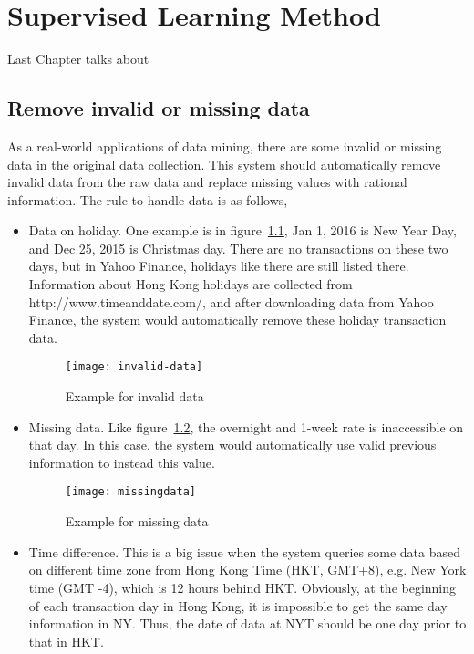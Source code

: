 \chapter{Supervised Learning Method}
\label{ch:machine}

Last Chapter talks about 

\section{Remove invalid or missing data}
As a real-world applications of data mining, there are some invalid or missing data in the original data collection. This system should automatically remove invalid data from the raw data and replace missing values with rational information. The rule to handle data is as follows,

\begin{itemize}
	\item Data on holiday. One example is in figure~\ref{fg:invalid_data}, Jan 1, 2016 is New Year Day, and Dec 25, 2015 is Christmas day. There are no transactions on these two days, but in Yahoo Finance, holidays like there are still listed there. Information about Hong Kong holidays are collected from http://www.timeanddate.com/, and after downloading data from Yahoo Finance, the system would automatically remove these holiday transaction data.
	\begin{figure}[h]
		\centering
		\texttt{[image: invalid-data]}
		\caption{Example for invalid data}
		\label{fg:invalid_data}
	\end{figure}
	\item Missing data. Like figure~\ref{fg:missing_data}, the overnight and 1-week rate is inaccessible on that day. In this case, the system would automatically use valid previous information to instead this value.
	\begin{figure}[h]
		\centering
		\texttt{[image: missingdata]}
		\caption{Example for missing data}
		\label{fg:missing_data}
	\end{figure}
	\item Time difference. This is a big issue when the system queries some data based on different time zone from Hong Kong Time (HKT, GMT+8), e.g. New York time (GMT -4), which is 12 hours behind HKT. Obviously, at the beginning of each transaction day in Hong Kong, it is impossible to get the same day information in NY. Thus, the date of data at NYT should be one day prior to that in HKT.
\end{itemize}


